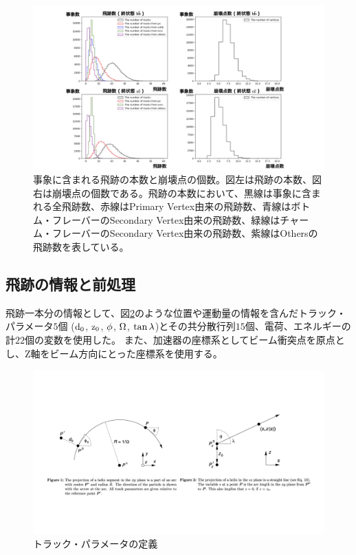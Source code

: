 \begin{figure}[htbp]
 \centering
 \includegraphics[trim = 150 0 150 0, width=1.0\textwidth, clip]{Figure/3Networks/3-1-1-2TracksandVertices.png}
 \caption[事象に含まれる飛跡の本数と崩壊点の個数]{事象に含まれる飛跡の本数と崩壊点の個数。図左は飛跡の本数、図右は崩壊点の個数である。飛跡の本数において、黒線は事象に含まれる全飛跡数、赤線はPrimary Vertex由来の飛跡数、青線はボトム・フレーバーのSecondary Vertex由来の飛跡数、緑線はチャーム・フレーバーのSecondary Vertex由来の飛跡数、紫線はOthersの飛跡数を表している。}
 \label{3-1-1-2TracksandVertices}
\end{figure}


\subsection{飛跡の情報と前処理} \label{Net:Data:TrackInformationandPreprocessing}

飛跡一本分の情報として、図\ref{3-1-2-1TrackParameters}のような位置や運動量の情報を含んだトラック・パラメータ$5$個 ($\rm d_0$, $\rm z_0$, $\rm \phi$, $\rm \Omega$, $\rm \tan{\lambda}$)\cite{TrackParametersLCIO}とその共分散行列$15$個、電荷、エネルギーの計$22$個の変数を使用した。
また、加速器の座標系としてビーム衝突点を原点とし、Z軸をビーム方向にとった座標系を使用する。

\begin{figure}[htbp]
 \centering
 \includegraphics[trim = 50 150 50 250, width=1.0\textwidth, clip]{Figure/3Networks/3-1-2-1TrackParameters.png}
 \caption[トラック・パラメータの定義]{トラック・パラメータの定義\cite{TrackParametersLCIO}}
 \label{3-1-2-1TrackParameters}
\end{figure}

